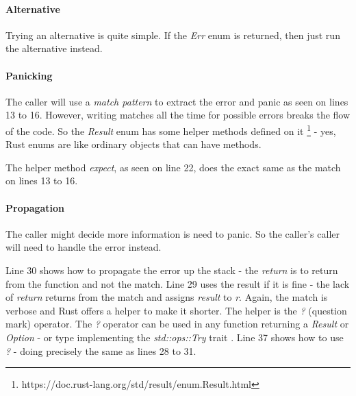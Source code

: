 \paragraph{Alternative}
Trying an alternative is quite simple.
If the \textit{Err} enum is returned, then just run the alternative instead.

\paragraph{Panicking}
The caller will use a \textit{match pattern} to extract the error and panic as seen on lines 13 to 16.
However, writing matches all the time for possible errors breaks the flow of the code.
So the \textit{Result} enum has some helper methods defined on it \footnote{https://doc.rust-lang.org/std/result/enum.Result.html} - yes, Rust enums are like ordinary objects that can have methods.

The helper method \textit{expect}, as seen on line 22, does the exact same as the match on lines 13 to 16.

\paragraph{Propagation}
The caller might decide more information is need to panic.
So the caller's caller will need to handle the error instead.

Line 30 shows how to propagate the error up the stack - the \textit{return} is to return from the function and not the match.
Line 29 uses the result if it is fine - the lack of \textit{return} returns from the match and assigns \textit{result} to \textit{r}.
Again, the match is verbose and Rust offers a helper to make it shorter.
The helper is the \textit{?} (question mark) operator.
The \textit{?} operator can be used in any function returning a \textit{Result} or \textit{Option} - or type implementing the \textit{std::ops::Try} trait \cite{klabnik_2019_01}.
Line 37 shows how to use \textit{?} - doing precisely the same as lines 28 to 31.


